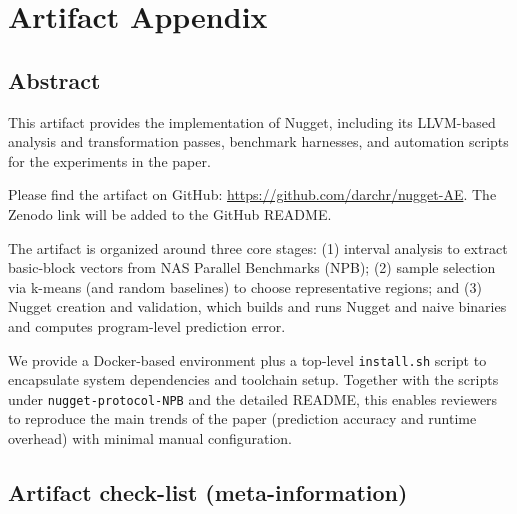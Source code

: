 \appendix
\section{Artifact Appendix}

\subsection{Abstract}

This artifact provides the implementation of Nugget, including its LLVM-based analysis and transformation passes, benchmark harnesses, and automation scripts for the experiments in the paper. 

Please find the artifact on GitHub: \url{https://github.com/darchr/nugget-AE}. 
The Zenodo link will be added to the GitHub README.

The artifact is organized around three core stages:
(1) interval analysis to extract basic-block vectors from NAS Parallel Benchmarks (NPB);
(2) sample selection via k-means (and random baselines) to choose representative regions; and
(3) Nugget creation and validation, which builds and runs Nugget and naive binaries and computes program-level prediction error.

We provide a Docker-based environment plus a top-level \texttt{install.sh} script to encapsulate system dependencies and toolchain setup. Together with the scripts under \texttt{nugget-protocol-NPB} and the detailed README, this enables reviewers to reproduce the main trends of the paper (prediction accuracy and runtime overhead) with minimal manual configuration.

\subsection{Artifact check-list (meta-information)}

